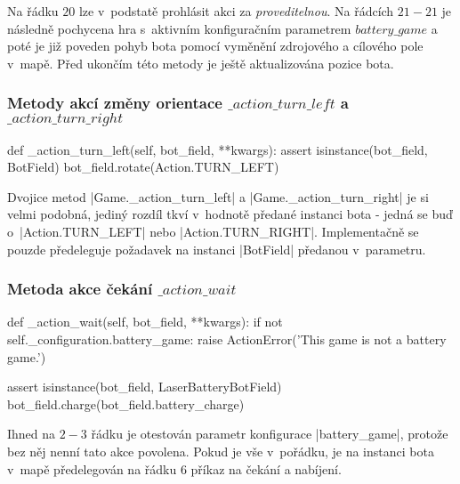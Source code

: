 {Na řádku $20$ lze v~podstatě prohlásit akci za \emph{proveditelnou}. Na řádcích $21-21$ je následně pochycena hra s~aktivním konfiguračním parametrem $battery\_game$ a poté je již poveden pohyb bota pomocí vyměnění zdrojového a cílového pole v~mapě. Před ukončím této metody je ještě aktualizována pozice bota.

\subsubsection[Metody akcí změny orientace]{Metody akcí změny orientace $\_action\_turn\_left$ a $\_action\_turn\_right$}
\label{subsubsec:method-action-turn-left}
\label{subsubsec:method-action-turn-right}

\begin{code}[caption={Metoda $Game.\_action\_turn\_left$},label={lst:game-action-turn-left}]
def _action_turn_left(self, bot_field, **kwargs):
    assert isinstance(bot_field, BotField)
    bot_field.rotate(Action.TURN_LEFT)
\end{code}

\begin{sloppypar}
    Dvojice metod \ic|Game._action_turn_left| a \ic|Game._action_turn_right| je si velmi podobná, jediný rozdíl tkví v~hodnotě předané instanci bota - jedná se buď o~\ic|Action.TURN_LEFT| nebo \ic|Action.TURN_RIGHT|. Implementačně se pouzde předeleguje požadavek na instanci \ic|BotField| předanou v~parametru.
\end{sloppypar}

\subsubsection{Metoda akce čekání $\_action\_wait$}
\label{subsubsec:method-action-wait}

\begin{code}[caption={Metoda $Game.\_action\_wait$},label={lst:game-action-wait}]
def _action_wait(self, bot_field, **kwargs):
    if not self._configuration.battery_game:
        raise ActionError('This game is not a battery game.')

    assert isinstance(bot_field, LaserBatteryBotField)
    bot_field.charge(bot_field.battery_charge)
\end{code}

Ihned na $2-3$ řádku je otestován parametr konfigurace \ic|battery_game|, protože bez něj nenní tato akce povolena. Pokud je vše v~pořádku, je na instanci bota v~mapě předelegován na řádku $6$ příkaz na čekání a nabíjení.

}
